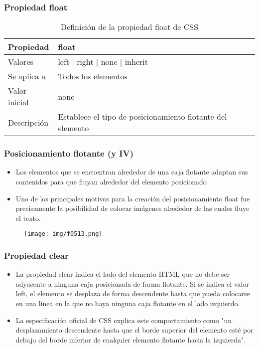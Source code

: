 \begin{frame}
\frametitle{Propiedad float}

\begin{center}
  \begin{table}
   \begin{tabular}{p{1.8cm}p{7.8cm}}
Propiedad & \bf{float} \\ \hline
Valores& left | right | none | inherit \\ \hline
Se aplica a& Todos los elementos \\ \hline
Valor inicial& none \\ \hline
Descripción& Establece el tipo de posicionamiento flotante del elemento \\ \hline
  \end{tabular}
   \caption{Definición de la propiedad float de CSS}
 \end{table}
\end{center}


\end{frame}



\begin{frame}
\frametitle{Posicionamiento flotante (y IV)}

\begin{itemize}
  \item Los elementos que se encuentran alrededor de una caja flotante adaptan sus contenidos para que fluyan alrededor del elemento posicionado
  \item Uno de los principales motivos para la creación del posicionamiento float fue precisamente la posibilidad de colocar imágenes alrededor de las cuales fluye el texto.
\end{itemize}


\begin{center}
\begin{figure}[p]
\texttt{[image: img/f0513.png]}
\end{figure}
\end{center}

\end{frame}



\begin{frame}
\frametitle{Propiedad clear}

\begin{itemize}
  \item La propiedad clear indica el lado del elemento HTML que no debe ser adyacente a ninguna caja posicionada de forma flotante. Si se indica el valor left, el elemento se desplaza de forma descendente hasta que pueda colocarse en una línea en la que no haya ninguna caja flotante en el lado izquierdo.
  \item La especificación oficial de CSS explica este comportamiento como "un desplazamiento descendente hasta que el borde superior del elemento esté por debajo del borde inferior de cualquier elemento flotante hacia la izquierda".
\end{itemize}

\end{frame}


